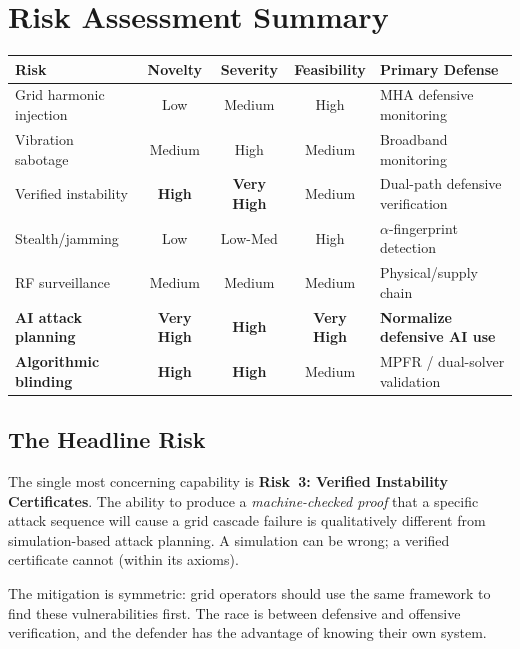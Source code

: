 \documentclass[11pt,a4paper]{article}
\begin{document}
\section{Risk Assessment Summary}

\begin{center}
\small
\begin{tabular}{@{}lcccl@{}}
\toprule
\textbf{Risk} & \textbf{Novelty} & \textbf{Severity} &
\textbf{Feasibility} & \textbf{Primary Defense} \\
\midrule
Grid harmonic injection & Low & Medium & High & MHA defensive monitoring \\
Vibration sabotage & Medium & High & Medium & Broadband monitoring \\
Verified instability & \textbf{High} & \textbf{Very High} &
  Medium & Dual-path defensive verification \\
Stealth/jamming & Low & Low-Med & High & $\alpha$-fingerprint detection \\
RF surveillance & Medium & Medium & Medium & Physical/supply chain \\
\textbf{AI attack planning} & \textbf{Very High} & \textbf{High} &
  \textbf{Very High} & \textbf{Normalize defensive AI use} \\
\textbf{Algorithmic blinding} & \textbf{High} & \textbf{High} &
  Medium & MPFR / dual-solver validation \\
\bottomrule
\end{tabular}
\end{center}

\subsection{The Headline Risk}

The single most concerning capability is \textbf{Risk~3: Verified
Instability Certificates}. The ability to produce a
\emph{machine-checked proof} that a specific attack sequence will
cause a grid cascade failure is qualitatively different from
simulation-based attack planning. A simulation can be wrong; a
verified certificate cannot (within its axioms).

The mitigation is symmetric: grid operators should use the same
framework to find these vulnerabilities first. The race is between
defensive and offensive verification, and the defender has the
advantage of knowing their own system.

\end{document}
